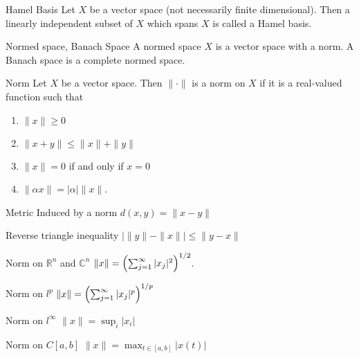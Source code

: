 \documentclass[avery5388,grid,frame]{flashcards}
\begin{document}
\begin{flashcard}[Definition]{Hamel Basis}
Let $X$ be a vector space (not necessarily finite dimensional). Then a linearly independent subset of $X$ which spans $X$ is called a Hamel basis.
\end{flashcard}

\begin{flashcard}[Definition]{Normed space, Banach Space}
A normed space $X$ is a vector space with a norm.
A Banach space is a complete normed space.
\end{flashcard}

\begin{flashcard}[Definition]{Norm}
Let $X$ be a vector space. Then $\|\cdot\|$ is a norm on $X$ if it is a real-valued function such that
\begin{enumerate}
\item $\|x\|\geq 0$
\item $\|x+y\|\leq\|x\|+\|y\|$
\item $\|x\|=0$ if and only if $x=0$
\item $\|\alpha x\|=|\alpha|\|x\|$.
\end{enumerate}
\end{flashcard}

\begin{flashcard}[Definition]{Metric Induced by a norm}
$d(x,y)=\|x-y\|$
\end{flashcard}

\begin{flashcard}[Definition]{Reverse triangle inequality}
$|\|y\|-\|x\||\leq\|y-x\|$
\end{flashcard}

\begin{flashcard}[Example]{Norm on $\mathbb{R}^n$ and $\mathbb{C}^n$}
$\|x\|=\Bigl(\sum_{j=1}^\infty |x_j|^2\Bigr)^{1/2}$.
\end{flashcard}

\begin{flashcard}[Example]{Norm on $l^p$}
$\|x\|=\Bigl(\sum_{j=1}^\infty|x_j|^p\Bigr)^{1/p}$
\end{flashcard}

\begin{flashcard}[Example]{Norm on $l^\infty$}
$\|x\|=\sup_i|x_i|$
\end{flashcard}

\begin{flashcard}[Example]{Norm on $C[a,b]$}
$\|x\|=\max_{t\in[a,b]}|x(t)|$
\end{flashcard}
\end{document}
